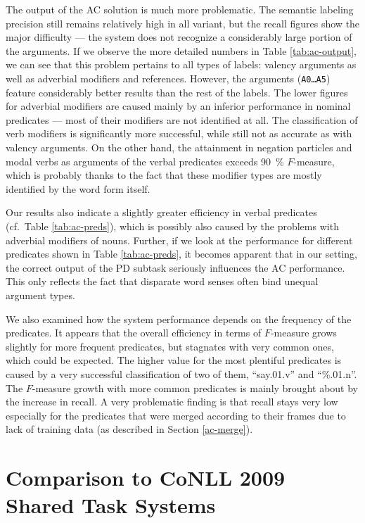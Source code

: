 \documentclass[12pt,notitlepage,a4paper]{report}
\begin{document}
The output of the AC solution is much more problematic. The semantic labeling precision still remains relatively high in all variant, but the recall figures show the major difficulty --- the system does not recognize a considerably large portion of the arguments. If we observe the more detailed numbers in Table \ref{tab:ac-output}, we can see that this problem pertains to all types of labels: valency arguments as well as adverbial modifiers and references. However, the arguments (\texttt{A0\dots A5}) feature considerably better results than the rest of the labels. The lower figures for adverbial modifiers are caused mainly by an inferior performance in nominal predicates --- most of their modifiers are not identified at all. The classification of verb modifiers is significantly more successful, while still not as accurate as with valency arguments. On the other hand, the attainment in negation particles and modal verbs as arguments of the verbal predicates exceeds 90~\% $F$-measure, which is probably thanks to the fact that these modifier types are mostly identified by the word form itself.

Our results also indicate a slightly greater efficiency in verbal predicates (cf.\ Table \ref{tab:ac-preds}), which is possibly also caused by the problems with adverbial modifiers of nouns. Further, if we look at the performance for different predicates shown in Table \ref{tab:ac-preds}, it becomes apparent that in our setting, the correct output of the PD subtask seriously influences the AC performance. This only reflects the fact that disparate word senses often bind unequal argument types.

We also examined how the system performance depends on the frequency of the predicates. It appears that the overall efficiency in terms of $F$-measure grows slightly for more frequent predicates, but stagnates with very common ones, which could be expected. The higher value for the most plentiful predicates is caused by a very successful classification of two of them, ``say.01.v'' and ``\%.01.n''. The $F$-measure growth with more common predicates is mainly brought about by the increase in recall. A very problematic finding is that recall stays very low especially for the predicates that were merged according to their frames due to lack of training data (as described in Section \ref{ac-merge}).

\section{Comparison to CoNLL 2009 Shared Task Systems}\label{comparison}
\end{document}
